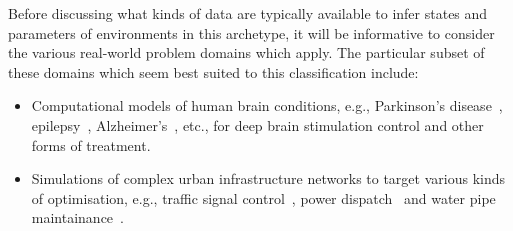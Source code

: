 Before discussing what kinds of data are typically available to infer states and parameters of environments in this archetype, it will be informative to consider the various real-world problem domains which apply. The particular subset of these domains which seem best suited to this classification include:
\begin{itemize}
\item{Computational models of human brain conditions, e.g., Parkinson's disease~\cite{lu2019application}, epilepsy~\cite{pineau2009treating}, Alzheimer's~\cite{saboo2021reinforcement}, etc., for deep brain stimulation control and other forms of treatment.}
\item{Simulations of complex urban infrastructure networks to target various kinds of optimisation, e.g., traffic signal control~\cite{yau2017survey}, power dispatch~\cite{li2021integrating} and water pipe maintainance~\cite{bukhsh2023maintenance}.}
\end{itemize}
